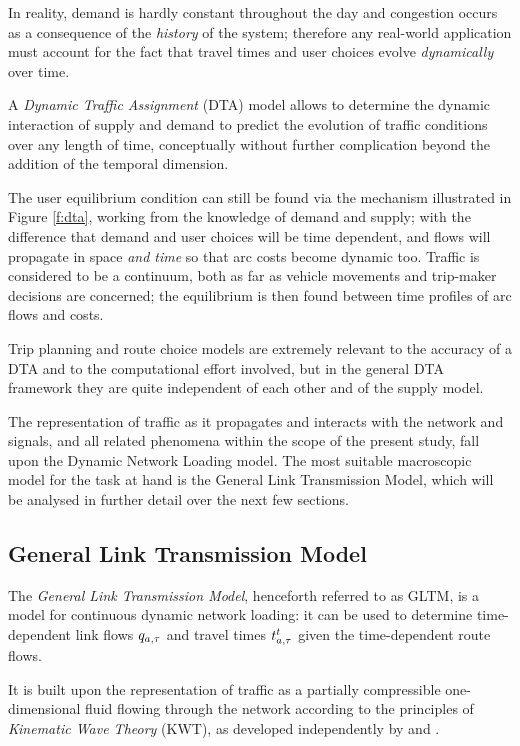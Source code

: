 In reality, demand is hardly constant throughout the day and congestion occurs as a consequence of the \emph{history} of the system; therefore any real-world application must account for the fact that travel times and user choices evolve \emph{dynamically} over time.

A \emph{Dynamic Traffic Assignment} (DTA) model allows to determine the dynamic interaction of supply and demand to predict the evolution of traffic conditions over any length of time, conceptually without further complication beyond the addition of the temporal dimension.

The user equilibrium condition can still be found via the mechanism illustrated in Figure \ref{f:dta}, working from the knowledge of demand and supply; with the difference that demand and user choices will be time dependent, and flows will propagate in space \emph{and time} so that arc costs become dynamic too. Traffic is considered to be a continuum, both as far as vehicle movements and trip-maker decisions are concerned; the equilibrium is then found between time profiles of arc flows and costs.

Trip planning and route choice models are extremely relevant to the accuracy of a DTA and to the computational effort involved, but in the general DTA framework they are quite independent of each other and of the supply model.

The representation of traffic as it propagates and interacts with the network and signals, and all related phenomena within the scope of the present study, fall upon the Dynamic Network Loading model.
The most suitable macroscopic model for the task at hand is the General Link Transmission Model, which will be analysed in further detail over the next few sections.

\subsection{General Link Transmission Model}
The \emph{General Link Transmission Model}, henceforth referred to as GLTM, is a model for continuous dynamic network loading: it can be used to determine time-dependent link flows $q_{a,\tau}$ and travel times $t_{a,\tau}^t$ given the time-dependent route flows.

It is built upon the representation of traffic as a partially compressible one-dimensional fluid flowing through the network according to the principles of \emph{Kinematic Wave Theory} (KWT), as developed independently by \cite{lighthill1955kinematic} and \cite{richards1956shock}.

